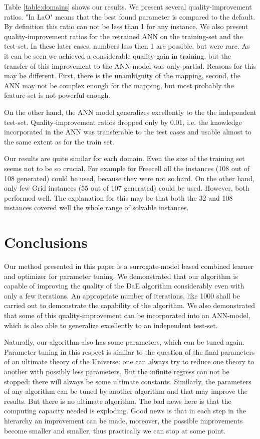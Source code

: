 \documentclass{acm_proc_article-sp}
\begin{document}
Table \ref{table:domains} shows our results. We present several quality-improvement ratios. "In LaO" means that the best found parameter is compared to the default. By definition this ratio can not be less than 1 for any instance. We also present quality-improvement ratios for the retrained ANN on the training-set and the test-set. In these later cases, numbers less then 1 are possible, but were rare. As it can be seen we achieved a considerable quality-gain in training, but the transfer of this improvement to the ANN-model was only partial. Reasons for this may be different. First, there is the unambiguity of the mapping, second, the ANN may not be complex enough for the mapping, but most probably the feature-set is not powerful enough. 

On the other hand, the ANN model generalizes excellently to the the independent test-set. Quality-improvement ratios dropped only by 0.01, i.e. the knowledge incorporated in the ANN was transferable to the test cases and usable almost to the same extent as for the train set.

Our results are quite similar for each domain. Even the size of the training set seems not to be so crucial. For example for Freecell all the instances (108 out of 108 generated) could be used, because they were not so hard. On the other hand, only few  Grid instances (55 out of 107 generated) could be used. However, both performed well. The explanation for this may be that both the 32 and 108 instances covered well the whole range of solvable instances.

\section{Conclusions}
\label{section:conclusions}

Our method presented in this paper is a surrogate-model based combined learner and optimizer for parameter tuning. We demonstrated that our algorithm is capable of improving the quality of the DaE algorithm considerably even with only a few iterations. An appropriate number of iterations, like 1000 shall be carried out to demonstrate the capability of the algorithm. We also demonstrated that some of this quality-improvement can be incorporated into an ANN-model, which is also able to generalize excellently to an independent test-set.

Naturally, our algorithm also has some parameters, which can be tuned again. Parameter tuning in this respect is similar to the question of the final parameters of an ultimate theory of the Universe: one can always try to reduce one theory to another with possibly less parameters. But the infinite regress can not be stopped: there will always be some ultimate constants. Similarly, the parameters of any algorithm can be tuned by another algorithm and that may improve the results. But there is no ultimate algorithm. The bad news here is that the computing capacity needed is exploding. Good news is that in each step in the hierarchy an improvement can be made, moreover, the possible improvements become smaller and smaller, thus practically we can stop at some point. 
\end{document}
